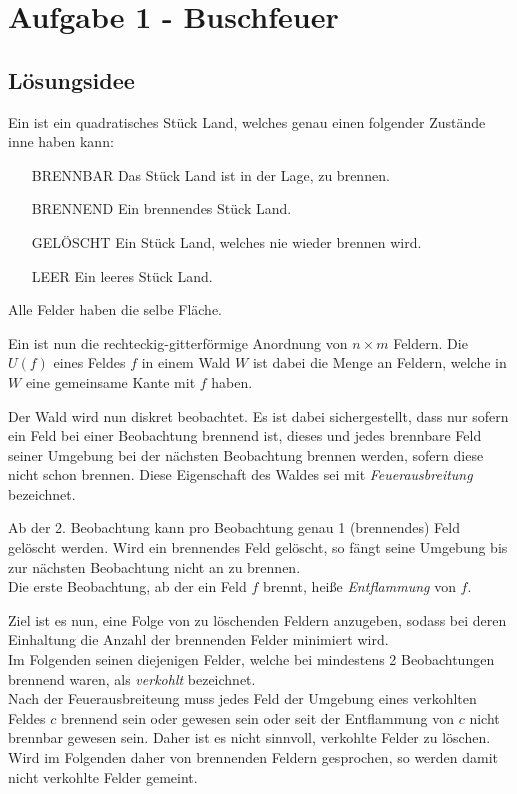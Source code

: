 \section{Aufgabe 1 - Buschfeuer}
\subsection{Lösungsidee}

Ein  ist ein quadratisches Stück Land, welches genau einen folgender Zustände inne haben kann:
\begin{itemize}
\item[BRENNBAR] Das Stück Land ist in der Lage, zu brennen.
\item[BRENNEND] Ein brennendes Stück Land.
\item[GELÖSCHT] Ein Stück Land, welches nie wieder brennen  wird.
\item[LEER] Ein leeres Stück Land.
\end{itemize}

Alle Felder haben die selbe Fläche.

Ein  ist nun die rechteckig-gitterförmige Anordnung von $n\times m$ Feldern. Die  $U(f)$ eines Feldes $f$ in einem Wald $W$ ist dabei die Menge an Feldern, welche in $W$ eine gemeinsame Kante mit $f$ haben.

Der Wald wird nun diskret beobachtet. Es ist dabei sichergestellt, dass nur sofern ein Feld bei einer Beobachtung brennend ist, dieses und jedes brennbare Feld seiner Umgebung bei der nächsten Beobachtung brennen werden, sofern diese nicht schon brennen. Diese Eigenschaft des Waldes sei mit \emph{Feuerausbreitung} bezeichnet.

Ab der 2. Beobachtung kann pro Beobachtung genau 1 (brennendes) Feld gelöscht werden. Wird ein brennendes Feld gelöscht, so fängt seine Umgebung bis zur nächsten Beobachtung nicht an zu brennen.\\
Die erste Beobachtung, ab der ein Feld $f$ brennt, heiße \emph{Entflammung} von $f$.


Ziel ist es nun, eine Folge von zu löschenden Feldern anzugeben, sodass bei deren Einhaltung die Anzahl der brennenden Felder minimiert wird.\\


Im Folgenden seinen diejenigen Felder, welche bei mindestens 2 Beobachtungen brennend waren, als \emph{verkohlt} bezeichnet.\\
Nach der Feuerausbreiteung muss jedes Feld der Umgebung eines verkohlten Feldes $c$ brennend sein oder gewesen sein oder seit der Entflammung von $c$ nicht brennbar gewesen sein. Daher ist es nicht sinnvoll, verkohlte Felder zu löschen. Wird im Folgenden daher von brennenden Feldern gesprochen, so werden damit nicht verkohlte Felder gemeint.

